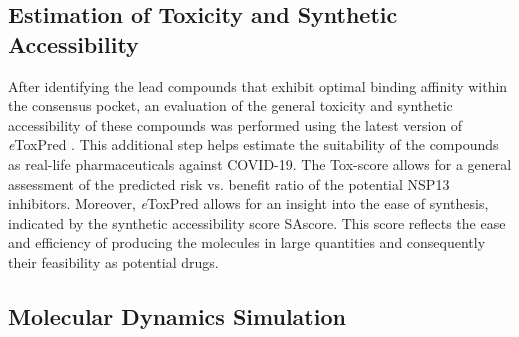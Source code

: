 \documentclass[11pt, letterpaper, titlepage]{article}
\renewcommand{\cite}{\parencite}
\begin{document}
\subsection{Estimation of Toxicity and Synthetic Accessibility}
 After identifying the lead compounds that exhibit optimal binding affinity within the consensus pocket, an evaluation of the general toxicity and synthetic accessibility of these compounds was performed using the latest version of \textit{e}ToxPred \cite{pu2019toxpred}. This additional step helps estimate the suitability of the compounds as real-life pharmaceuticals against COVID-19. The Tox-score allows for a general assessment of the predicted risk vs. benefit ratio of the potential NSP13 inhibitors. Moreover, \textit{e}ToxPred allows for an insight into the ease of synthesis, indicated by the synthetic accessibility score \ac{SAscore}. This score reflects the ease and efficiency of producing the molecules in large quantities and consequently their feasibility as potential drugs. 

\subsection{Molecular Dynamics Simulation}
                                                                                                                                                                                                          
\end{document}
